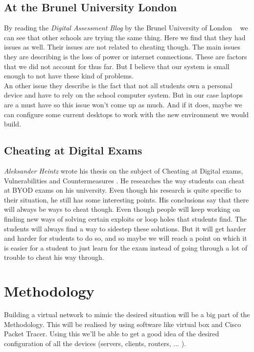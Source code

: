 \subsection{At the Brunel University London}
By reading the\emph{ Digital Assessment Blog} by the Brunel University of London ~\autocite{Brunel2017} we can see that other schools are trying the same thing. Here we find that they had issues as well. Their issues are not related to cheating though. The main issues they are describing is the loss of power or internet connections. These are factors that we did not account for thus far. But I believe that our system is small enough to not have these kind of problems. \\
An other issue they describe is the fact that not all students own a personal device and have to rely on the school computer system. But in our case laptops are a must have so this issue won’t come up as much. And if it does, maybe we can configure some current desktops to work with the new environment we would build. \\

\subsection{Cheating at Digital Exams}
\emph{Aleksander Heintz} wrote his thesis on the subject of Cheating at Digital exams, Vulnerabilities and Countermeasures \autocite {Heintz2017}. He researches the way students can cheat at BYOD exams on his university. Even though his research is quite specific to their situation, he still has some interesting points. His conclusions say that there will always be ways to cheat though. Even though people will keep working on finding new ways of solving certain exploits or loop holes that students find. The students will always find a way to sidestep these solutions. But it will get harder and harder for students to do so, and so maybe we will reach a point on which it is easier for a student to just learn for the exam instead of going through a lot of trouble to cheat his way through.

\section{Methodology}
\label{sec:methodologie}

Building a virtual network to mimic the desired situation will be a big part of the Methodology. This will be realised by using software like virtual box and Cisco Packet Tracer. Using this we'll be able to get a good idea of the desired configuration of all the devices (servers, clients, routers, ... ).

